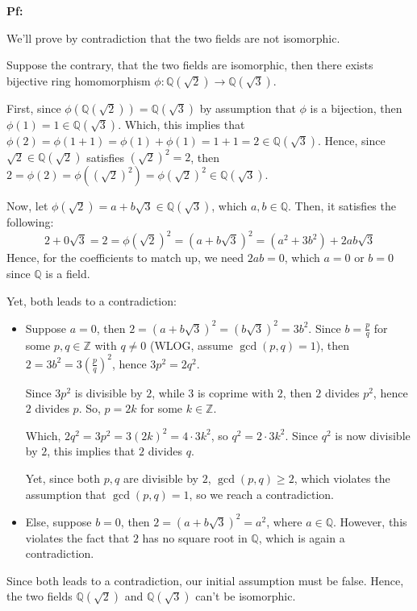 \documentclass{article}
\begin{document}
\textbf{Pf:}

We'll prove by contradiction that the two fields are not isomorphic.

Suppose the contrary, that the two fields are isomorphic, then there exists bijective ring homomorphism $\phi:\mathbb{Q}(\sqrt{2})\rightarrow\mathbb{Q}(\sqrt{3})$.

First, since $\phi(\mathbb{Q}(\sqrt{2}))= \mathbb{Q}(\sqrt{3})$ by assumption that $\phi$ is a bijection, then $\phi(1)=1\in\mathbb{Q}(\sqrt{3})$.
Which, this implies that $\phi(2)=\phi(1+1)=\phi(1)+\phi(1)=1+1=2\in\mathbb{Q}(\sqrt{3})$. Hence, since $\sqrt{2}\in\mathbb{Q}(\sqrt{2})$ satisfies $(\sqrt{2})^2=2$,
then $2=\phi(2)=\phi((\sqrt{2})^2)=\phi(\sqrt{2})^2\in\mathbb{Q}(\sqrt{3})$.

Now, let $\phi(\sqrt{2})=a+b\sqrt{3}\in\mathbb{Q}(\sqrt{3})$, which $a,b\in\mathbb{Q}$. Then, it satisfies the following:
$$2+0\sqrt{3}=2=\phi(\sqrt{2})^2=(a+b\sqrt{3})^2=(a^2+3b^2)+2ab\sqrt{3}$$
Hence, for the coefficients to match up, we need $2ab = 0$, which $a=0$ or $b=0$ since $\mathbb{Q}$ is a field.

Yet, both leads to a contradiction:
\begin{itemize}
    \item Suppose $a=0$, then $2=(a+b\sqrt{3})^2=(b\sqrt{3})^2=3b^2$. Since $b=\frac{p}{q}$ for some $p,q\in\mathbb{Z}$ with $q\neq 0$ (WLOG, assume $\gcd(p,q)=1$),
    then $2=3b^2=3(\frac{p}{q})^2$, hence $3p^2=2q^2$.
    
    Since $3p^2$ is divisible by $2$, while $3$ is coprime with $2$, then $2$ divides $p^2$, hence $2$ divides $p$. So, $p=2k$ for some $k\in\mathbb{Z}$.

    Which, $2q^2=3p^2=3(2k)^2=4\cdot 3k^2$, so $q^2=2\cdot 3k^2$. Since $q^2$ is now divisible by $2$, this implies that $2$ divides $q$.

    Yet, since both $p,q$ are divisible by $2$, $\gcd(p,q)\geq 2$, which violates the assumption that $\gcd(p,q)=1$, so we reach a contradiction.

    \item Else, suppose $b=0$, then $2=(a+b\sqrt{3})^2=a^2$, where $a\in\mathbb{Q}$. However, this violates the fact that $2$ has no square root in $\mathbb{Q}$, which is again a contradiction.
\end{itemize}

Since both leads to a contradiction, our initial assumption must be false. Hence, the two fields $\mathbb{Q}(\sqrt{2})$ and $\mathbb{Q}(\sqrt{3})$ can't be isomorphic.
\end{document}
